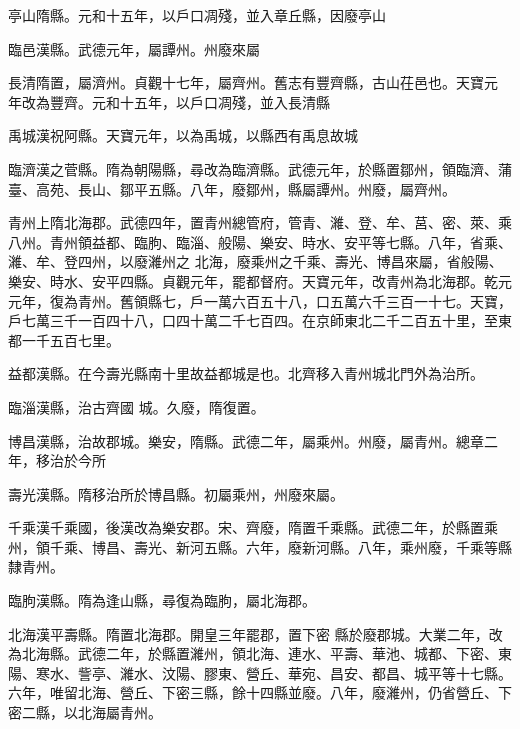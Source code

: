 \begin{pinyinscope}
 亭山隋縣。元和十五年，以戶口凋殘，並入章丘縣，因廢亭山



 臨邑漢縣。武德元年，屬譚州。州廢來屬



 長清隋置，屬濟州。貞觀十七年，屬齊州。舊志有豐齊縣，古山茌邑也。天寶元
 年改為豐齊。元和十五年，以戶口凋殘，並入長清縣



 禹城漢祝阿縣。天寶元年，以為禹城，以縣西有禹息故城



 臨濟漢之菅縣。隋為朝陽縣，尋改為臨濟縣。武德元年，於縣置鄒州，領臨濟、蒲臺、高苑、長山、鄒平五縣。八年，廢鄒州，縣屬譚州。州廢，屬齊州。



 青州上隋北海郡。武德四年，置青州總管府，管青、濰、登、牟、莒、密、萊、乘八州。青州領益都、臨朐、臨淄、般陽、樂安、時水、安平等七縣。八年，省乘、濰、牟、登四州，以廢濰州之
 北海，廢乘州之千乘、壽光、博昌來屬，省般陽、樂安、時水、安平四縣。貞觀元年，罷都督府。天寶元年，改青州為北海郡。乾元元年，復為青州。舊領縣七，戶一萬六百五十八，口五萬六千三百一十七。天寶，戶七萬三千一百四十八，口四十萬二千七百四。在京師東北二千二百五十里，至東都一千五百七里。



 益都漢縣。在今壽光縣南十里故益都城是也。北齊移入青州城北門外為治所。



 臨淄漢縣，治古齊國
 城。久廢，隋復置。



 博昌漢縣，治故郡城。樂安，隋縣。武德二年，屬乘州。州廢，屬青州。總章二年，移治於今所



 壽光漢縣。隋移治所於博昌縣。初屬乘州，州廢來屬。



 千乘漢千乘國，後漢改為樂安郡。宋、齊廢，隋置千乘縣。武德二年，於縣置乘州，領千乘、博昌、壽光、新河五縣。六年，廢新河縣。八年，乘州廢，千乘等縣隸青州。



 臨朐漢縣。隋為逢山縣，尋復為臨朐，屬北海郡。



 北海漢平壽縣。隋置北海郡。開皇三年罷郡，置下密
 縣於廢郡城。大業二年，改為北海縣。武德二年，於縣置濰州，領北海、連水、平壽、華池、城都、下密、東陽、寒水、訾亭、濰水、汶陽、膠東、營丘、華宛、昌安、都昌、城平等十七縣。六年，唯留北海、營丘、下密三縣，餘十四縣並廢。八年，廢濰州，仍省營丘、下密二縣，以北海屬青州。




\end{pinyinscope}
